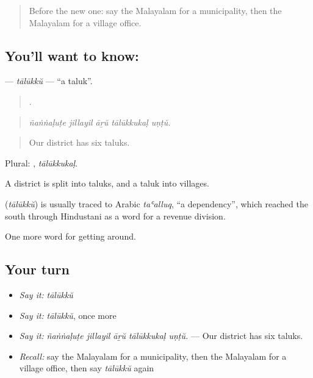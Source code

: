 \label{lesson:ML-C487-talukku}



\begin{quote}
Before the new one: say the Malayalam for a municipality, then the Malayalam for a village office.
\end{quote}

\subsection*{You'll want to know: }
\textbf{} — \emph{tālūkkŭ} — \textquotedblleft{}a taluk\textquotedblright{}.

\begin{quote}
    .
\end{quote}

\begin{quote}
\emph{ñaṅṅaḷuṭe jillayil āṟŭ tālūkkukaḷ uṇṭŭ.}
\end{quote}

\begin{quote}
Our district has six taluks.
\end{quote}

Plural: , \emph{tālūkkukaḷ}.

A district is split into taluks, and a taluk into villages.

\begin{cousinweb}
\textbf{} (\emph{tālūkkŭ}) is usually traced to Arabic \emph{taʿalluq}, \textquotedblleft{}a dependency\textquotedblright{}, which reached the south through Hindustani as a word for a revenue division.
\end{cousinweb}

\begin{grammarlens}[title={What you've built}]
One more word for getting around.
\end{grammarlens}

\subsection*{Your turn}
\begin{itemize}
\raggedright
  \item \emph{Say it:} \emph{tālūkkŭ}
  \item \emph{Say it:} \emph{tālūkkŭ}, once more
  \item \emph{Say it:} \emph{ñaṅṅaḷuṭe jillayil āṟŭ tālūkkukaḷ uṇṭŭ.} — Our district has six taluks.
  \item \emph{Recall:} say the Malayalam for a municipality, then the Malayalam for a village office, then say \emph{tālūkkŭ} again
\end{itemize}

